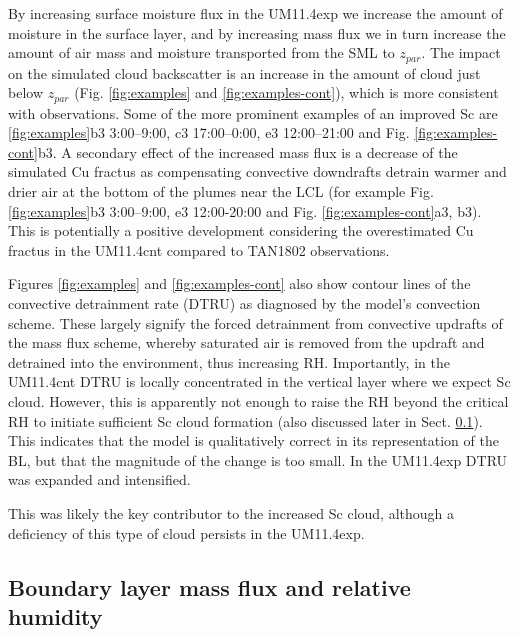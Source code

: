 By increasing surface moisture flux in the UM11.4exp we increase
the amount of moisture in the surface layer, and by increasing mass
flux we in turn increase the amount of air mass and moisture transported
from the SML to $z_{par}$. The impact on the simulated
cloud backscatter is an increase in the amount of cloud just below $z_{par}$ (Fig.
\ref{fig:examples} and \ref{fig:examples-cont}),
which is more consistent with observations. Some of the more
prominent examples of an improved Sc are \ref{fig:examples}b3 3:00--9:00, c3 17:00--0:00,
e3 12:00--21:00 and Fig. \ref{fig:examples-cont}b3. A secondary effect
of the increased mass flux is a decrease of the simulated Cu fractus as
compensating convective downdrafts detrain warmer and drier air at the bottom
of the plumes near the LCL (for example Fig. \ref{fig:examples}b3 3:00--9:00, e3 12:00-20:00
and Fig. \ref{fig:examples-cont}a3, b3). This is potentially a positive
development considering the overestimated Cu fractus in the UM11.4cnt compared
to TAN1802 observations.

Figures \ref{fig:examples} and \ref{fig:examples-cont} also show contour lines
of the convective detrainment rate (DTRU) as diagnosed by the model's
convection scheme. These largely signify the forced detrainment from convective
updrafts of the mass flux scheme, whereby saturated air is removed from the
updraft and detrained into the environment, thus increasing RH.
Importantly, in the UM11.4cnt DTRU is locally concentrated in the vertical layer
where we expect Sc cloud. However, this is apparently not enough to raise the RH beyond the critical RH to initiate sufficient Sc cloud formation (also discussed later in Sect.
\ref{sec:bl-mass-flux-and-rh}).
This indicates that the model is qualitatively correct in its representation
of the BL, but that the magnitude of the change is too small. In the UM11.4exp DTRU was expanded and intensified. 


This was likely the key contributor to the increased
Sc cloud, although a deficiency of this type of cloud persists in the
UM11.4exp.

\subsection{Boundary layer mass flux and relative humidity}
\label{sec:bl-mass-flux-and-rh}

